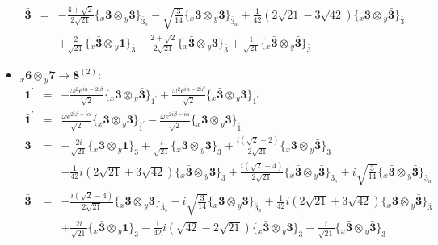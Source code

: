 \documentclass[english]{article}
\newcommand{\rep}[1]{\mathbf{#1}}
\newcommand{\repx}[2]{{}_{#2}\mathbf{#1}}
\newcommand{\subcg}[3]{\big\{ \repx{#1}{x}\otimes\repx{#2}{y}\big\}^{}_{#3}}
\begin{document}
\begin{itemize}
\begin{eqnarray*}
\\
\rep{\bar{3}} &=& -\frac{4+\sqrt{2}}{2 \sqrt{21}}\subcg{3}{3}{\bar{3}_{s}}-\sqrt{\frac{3}{14}}\subcg{3}{3}{\bar{3}_{a}}+\frac{1}{42} \left(2 \sqrt{21}-3 \sqrt{42}\right)\subcg{3}{\bar{3}}{\bar{3}} \\ 
 & & +\frac{2}{\sqrt{21}}\subcg{\bar{3}}{1}{\bar{3}}-\frac{2+\sqrt{2}}{2 \sqrt{21}}\subcg{\bar{3}}{3}{\bar{3}}+\frac{1}{\sqrt{21}}\subcg{\bar{3}}{\bar{3}}{\bar{3}}
\end{eqnarray*}
\item $\repx{6}{x}\otimes\repx{7}{y}\to\rep{8}^{(2)}$:
\begin{eqnarray*}
\rep{1^{\prime}} &=& -\frac{\omega ^2 e^{i \alpha -2 i \beta }}{\sqrt{2}}\subcg{3}{\bar{3}}{1^{\prime}}+\frac{\omega ^2 e^{i \alpha -2 i \beta }}{\sqrt{2}}\subcg{\bar{3}}{3}{1^{\prime}}
\\
\rep{\bar{1}^{\prime}} &=& \frac{\omega  e^{2 i \beta -i \alpha }}{\sqrt{2}}\subcg{3}{\bar{3}}{\bar{1}^{\prime}}-\frac{\omega  e^{2 i \beta -i \alpha }}{\sqrt{2}}\subcg{\bar{3}}{3}{\bar{1}^{\prime}}
\\
\rep{3} &=& -\frac{2 i}{\sqrt{21}}\subcg{3}{1}{3}+\frac{i}{\sqrt{21}}\subcg{3}{3}{3}+\frac{i \left(\sqrt{2}-2\right)}{2 \sqrt{21}}\subcg{3}{\bar{3}}{3} \\ 
 & & -\frac{1}{42} i \left(2 \sqrt{21}+3 \sqrt{42}\right)\subcg{\bar{3}}{3}{3}+\frac{i \left(\sqrt{2}-4\right)}{2 \sqrt{21}}\subcg{\bar{3}}{\bar{3}}{3_{s}}+i \sqrt{\frac{3}{14}}\subcg{\bar{3}}{\bar{3}}{3_{a}}
\\
\rep{\bar{3}} &=& -\frac{i \left(\sqrt{2}-4\right)}{2 \sqrt{21}}\subcg{3}{3}{\bar{3}_{s}}-i \sqrt{\frac{3}{14}}\subcg{3}{3}{\bar{3}_{a}}+\frac{1}{42} i \left(2 \sqrt{21}+3 \sqrt{42}\right)\subcg{3}{\bar{3}}{\bar{3}} \\ 
 & & +\frac{2 i}{\sqrt{21}}\subcg{\bar{3}}{1}{\bar{3}}-\frac{1}{42} i \left(\sqrt{42}-2 \sqrt{21}\right)\subcg{\bar{3}}{3}{\bar{3}}-\frac{i}{\sqrt{21}}\subcg{\bar{3}}{\bar{3}}{\bar{3}}
\end{eqnarray*}
\end{itemize}
\end{document}
